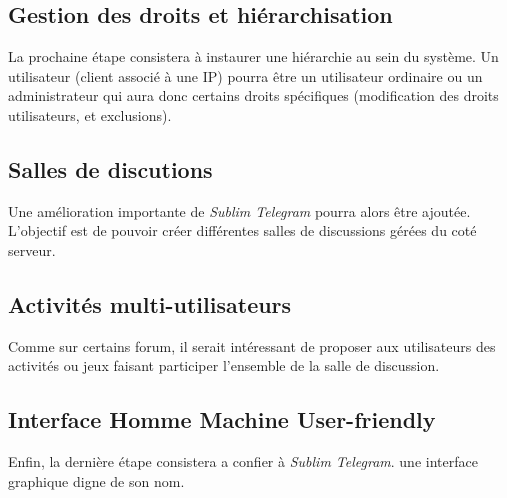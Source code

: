 \documentclass[a4paper, 12pt]{article}
\begin{document}
\subsection{Gestion des droits et hiérarchisation}
La prochaine étape consistera à instaurer une hiérarchie au sein du système. Un utilisateur (client associé à une IP) pourra être un utilisateur ordinaire ou un administrateur qui aura donc certains droits spécifiques (modification des droits utilisateurs, et exclusions).
\subsection{Salles de discutions}
Une amélioration importante de \emph{Sublim Telegram} pourra alors être ajoutée. L'objectif est de pouvoir créer différentes salles de discussions gérées du coté serveur.
\subsection{Activités multi-utilisateurs}
Comme sur certains forum, il serait intéressant de proposer aux utilisateurs des activités ou jeux faisant participer l'ensemble de la salle de discussion.
\subsection{Interface Homme Machine User-friendly}
Enfin, la dernière étape consistera a confier à \emph{Sublim Telegram}. une interface graphique digne de son nom.
\end{document}
